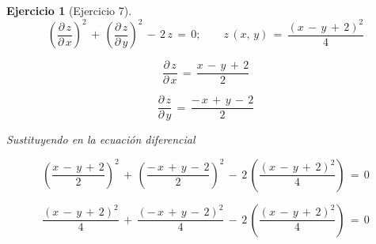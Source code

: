 \documentclass[a4paper,11pt,openany]{book}
\newtheorem{ejer}{Ejercicio}[section]
\begin{document}
\begin{ejer}[Ejercicio 7] 

$$\left(\dfrac{\partial\,z}{\partial\,x} \right)^{2}\,+\,\left(\dfrac{\partial\,z}{\partial\,y} \right)^{2}\,-\,2\,z\,=\,0; \qquad z\,(x,\,y)\,=\,\dfrac{(x\,-\,y\,+\,2)^{2}}{4}$$


$$\dfrac{\partial\,z}{\partial\,x}\,=\,\boxed{\dfrac{x\,-\,y\,+\,2}{2}}$$

$$\dfrac{\partial\,z}{\partial\,y}\,=\,\boxed{\dfrac{-\,x\,+\,y\,-\,2}{2}}$$

Sustituyendo en la ecuación diferencial

$$\left(\dfrac{x\,-\,y\,+\,2}{2}\right)^{2}\,+\,\left(\dfrac{-\,x\,+\,y\,-\,2}{2}\right)^{2}\,-\,2\,\left(\dfrac{(x\,-\,y\,+\,2)^{2}}{4}\right)\,=\,0$$

$$\dfrac{(x\,-\,y\,+\,2)^{2}}{4}\,+\,\dfrac{(-\,x\,+\,y\,-\,2)^{2}}{4}\,-\,2\,\left(\dfrac{(x\,-\,y\,+\,2)^{2}}{4}\right)\,=\,0$$

\end{ejer} 
\end{document}
